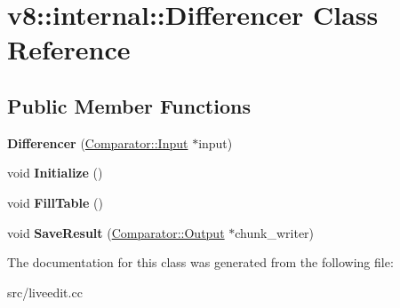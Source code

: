 \hypertarget{classv8_1_1internal_1_1_differencer}{}\section{v8\+:\+:internal\+:\+:Differencer Class Reference}
\label{classv8_1_1internal_1_1_differencer}
\subsection*{Public Member Functions}
\begin{DoxyCompactItemize}
\item 
\hypertarget{classv8_1_1internal_1_1_differencer_a1b5fd7095c8e88a767f3b70588ef280f}{}{\bfseries Differencer} (\hyperlink{classv8_1_1internal_1_1_comparator_1_1_input}{Comparator\+::\+Input} $\ast$input)\label{classv8_1_1internal_1_1_differencer_a1b5fd7095c8e88a767f3b70588ef280f}

\item 
\hypertarget{classv8_1_1internal_1_1_differencer_a859b793f1857bd6102101001afc1b7a9}{}void {\bfseries Initialize} ()\label{classv8_1_1internal_1_1_differencer_a859b793f1857bd6102101001afc1b7a9}

\item 
\hypertarget{classv8_1_1internal_1_1_differencer_aebab5489905a379f5435ba6b47d6bba6}{}void {\bfseries Fill\+Table} ()\label{classv8_1_1internal_1_1_differencer_aebab5489905a379f5435ba6b47d6bba6}

\item 
\hypertarget{classv8_1_1internal_1_1_differencer_a7c42ce28fa7cad5218ec9b5221924962}{}void {\bfseries Save\+Result} (\hyperlink{classv8_1_1internal_1_1_comparator_1_1_output}{Comparator\+::\+Output} $\ast$chunk\+\_\+writer)\label{classv8_1_1internal_1_1_differencer_a7c42ce28fa7cad5218ec9b5221924962}

\end{DoxyCompactItemize}


The documentation for this class was generated from the following file\+:\begin{DoxyCompactItemize}
\item 
src/liveedit.\+cc\end{DoxyCompactItemize}
